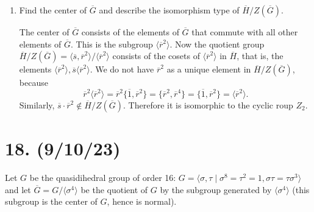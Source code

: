 \documentclass{article}
\begin{document}
\begin{enumerate}[label=(\alph*), itemsep=0em]
\begin{proof}
            The elements of $\overline{H}$ are $\overline{1}, \overline{s}, \overline{r}^2, \text{ and } \overline{s}\cdot\overline{r}^2$. Any other product of elements gives an element of $\overline{H}$. All of these elements have order 2, and so from Ch. 1.1, Exercise 36, $\overline{H} \cong V_4$.

            The complete preimage of $\overline{H}$ under the natural projection homomorphism $\pi(g) \mapsto \overline{g} = g \langle r^4 \rangle$ is the set $\{ g \in G \mid \pi(g) \in \overline{H} \}$. The elements of $G$ in the complete preimage of $\overline{H}$ are $1, r^2, r^4, r^6, s, sr^2, sr^4, \text{ and } sr^6$. This set of elements is isomorphic to $D_4$ (given by $s, r^2 \in \pi^{-1}(\overline{H}) \mapsto s, r \in D_4$).
          \end{proof}
    \item Find the center of $\overline{G}$ and describe the isomorphism type of $\overline{H}/Z(\overline{G})$.
          
          The center of $\overline{G}$ consists of the elements of $\overline{G}$ that commute with all other elements of $\overline{G}$. This is the subgroup $\langle \overline{r}^2 \rangle$. Now the quotient group $\overline{H}/Z(\overline{G}) = \langle \overline{s}, \overline{r}^2 \rangle / \langle \overline{r}^2 \rangle$ consists of the cosets of $\langle \overline{r}^2 \rangle$ in $\overline{H}$, that is, the elements $\langle \overline{r}^2 \rangle, \overline{s}\langle \overline{r}^2 \rangle$. We do not have $\overline{r}^2$ as a unique element in $\overline{H}/Z(\overline{G})$, because
          \begin{equation*}
            \overline{r}^2 \langle \overline{r}^2 \rangle = \overline{r}^2 \{ \overline{1}, \overline{r}^2 \} = \{ \overline{r}^2, \overline{r}^4 \} = \{ \overline{1}, \overline{r}^2 \} = \langle \overline{r}^2 \rangle.
          \end{equation*}
          Similarly, $\overline{s}\cdot\overline{r}^2 \notin \overline{H}/Z(\overline{G})$. Therefore it is isomorphic to the cyclic roup $Z_2$.
\end{enumerate}

\section*{18. (9/10/23)}

Let $G$ be the quasidihedral group of order 16: $G = \langle \sigma, \tau \mid \sigma^8 = \tau^2 = 1, \sigma \tau = \tau \sigma^3 \rangle$ and let $\overline{G} = G/\langle \sigma^4 \rangle$ be the quotient of $G$ by the subgroup generated by $\langle \sigma^4 \rangle$ (this subgroup is the center of $G$, hence is normal).
\end{document}
